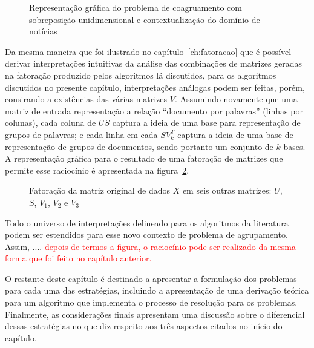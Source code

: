 \documentclass[
    12pt,                %
    oneside,            %
    a4paper,            %
    english,            %
    brazil                %
    ]{abntex2ppgsi}
\begin{document}


\begin{figure}[H]
\centering
    \caption{Representação gráfica do problema de coagruamento com sobreposição unidimensional e contextualização do domínio de notícias}
    \label{fig:repgrafica}
\end{figure}

Da mesma maneira que foi ilustrado no capítulo~\ref{ch:fatoracao} que é possível derivar interpretações intuitivas da análise das combinações de matrizes geradas na fatoração produzido pelos algoritmos lá discutidos, para os algoritmos discutidos no presente capítulo, interpretações análogas podem ser feitas, porém, consirando a existências das várias matrizes $V$. Assumindo novamente que uma matriz de entrada representação a relação ``documento por palavras'' (linhas por colunas), cada coluna de $US$ captura a ideia de uma base para representação de grupos de palavras; e cada linha em cada $SV_k^T$ captura a ideia de uma base de representação de grupos de documentos, sendo portanto um conjunto de $k$ bases. A representação gráfica para o resultado de uma fatoração de matrizes que permite esse raciocínio é apresentada na figura~\ref{fig:fatproposta}.

\begin{figure}[H]
\centering
    \caption{
        Fatoração da matriz original de dados $X$ em seis outras matrizes: $U$, $S$, $V_1$, $V_2$ e $V_3$}
    \label{fig:fatproposta}
\end{figure}

Todo o universo de interpretações delineado para os algoritmos da literatura podem ser estendidos para esse novo contexto de problema de agrupamento. Assim, .... \textcolor{red}{depois de termos a figura, o raciocínio pode ser realizado da mesma forma que foi feito no capítulo anterior.}

O restante deste capítulo é destinado a apresentar a formulação dos problemas para cada uma das estratégias, incluindo a apresentação de uma derivação teórica para um algoritmo que implementa o processo de resolução para os problemas. Finalmente, as considerações finais apresentam uma discussão sobre o diferencial dessas estratégias no que diz respeito aos três aspectos citados no início do capítulo.
\end{document}
